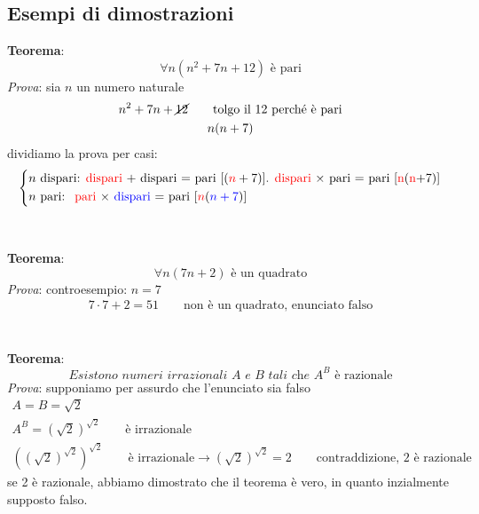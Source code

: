 \documentclass[italian]{article}
\begin{document}
\subsection{Esempi di dimostrazioni}
\textbf{Teorema}: \[\forall n (n^2+7n+12) \text{ è pari}\]
\textit{Prova}: sia $n$ un numero naturale
\begin{gather*}
	n^2 + 7n + \cancel{12} \qquad \text{tolgo il 12 perché è pari}\\
	n(n+7)
\end{gather*}
dividiamo la prova per casi:
\begin{gather*}
	\begin{cases*}
		n \text{ dispari: \textcolor{red}{dispari} + dispari = pari $[(\textcolor{red}{n}+7)]$. \textcolor{red}{dispari} $\times$ pari = pari [\textcolor{red}{n}(\textcolor{red}{n}+7)]} \\
		n \text{ pari: } \text{ \textcolor{red}{pari} $\times$ \textcolor{blue}{dispari} = pari $[\textcolor{red}{n}(\textcolor{blue}{n+7})]$}
	\end{cases*}
\end{gather*}\\\\
\textbf{Teorema}: \[\forall n (7n+2) \text{ è un quadrato}\]
\textit{Prova}: controesempio: $n=7$
\begin{gather*}
	7\cdot7 + 2 = 51 \qquad \text{non è un quadrato, enunciato falso}
\end{gather*}\\\\
\textbf{Teorema}: \[ \textit{Esistono numeri irrazionali $A$ e $B$ tali che }A^B \text{ è razionale}\]
\textit{Prova}: supponiamo per assurdo che l'enunciato sia falso
\begin{gather*}
	A = B = \sqrt{2}\\
	A^B = (\sqrt{2})^{\sqrt{2}} \qquad \text{è irrazionale}\\
	\left((\sqrt{2})^{\sqrt{2}}\right)^{\sqrt{2}} \qquad \text{è irrazionale} \to (\sqrt{2})^{\sqrt{2}} = 2 \qquad \text{contraddizione, 2 è razionale}
\end{gather*}
se 2 è razionale, abbiamo dimostrato che il teorema è vero, in quanto inzialmente supposto falso.


\pagebreak
\end{document}

